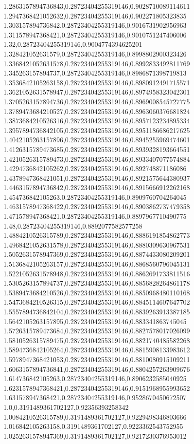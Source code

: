 1.2863157894736843,0.28723404255319146,0.9028710089114611
1.2947368421052632,0.28723404255319146,0.902271805323835
1.303157894736842,0.28723404255319146,0.9016731902956963
1.311578947368421,0.28723404255319146,0.9010751247406006
1.32,0.28723404255319146,0.9004774394625201
1.328421052631579,0.28723404255319146,0.8998802900323426
1.3368421052631578,0.28723404255319146,0.8992833492811769
1.345263157894737,0.28723404255319146,0.8986871398719813
1.3536842105263158,0.28723404255319146,0.8980912491715571
1.3621052631578947,0.28723404255319146,0.8974958323042301
1.3705263157894736,0.28723404255319146,0.8969008545727775
1.3789473684210527,0.28723404255319146,0.8963060376681824
1.3873684210526316,0.28723404255319146,0.8957123234895334
1.3957894736842105,0.28723404255319146,0.8951186686217625
1.4042105263157896,0.28723404255319146,0.8945255969474601
1.4126315789473685,0.28723404255319146,0.8939328193664551
1.4210526315789473,0.28723404255319146,0.8933407077574884
1.4294736842105262,0.28723404255319146,0.892748871186086
1.4378947368421051,0.28723404255319146,0.8921575644380937
1.4463157894736842,0.28723404255319146,0.8915666912262168
1.454736842105263,0.28723404255319146,0.8909760704264045
1.4631578947368422,0.28723404255319146,0.8903862737479358
1.471578947368421,0.28723404255319146,0.8897967710490775
1.48,0.28723404255319146,0.8892077582577258
1.4884210526315789,0.28723404255319146,0.8886191854862773
1.4968421052631578,0.28723404255319146,0.8880309630967531
1.5052631578947369,0.28723404255319146,0.8874433080209201
1.5136842105263157,0.28723404255319146,0.8868560796045131
1.5221052631578948,0.28723404255319146,0.8862691733811516
1.5305263157894737,0.28723404255319146,0.8856828264861178
1.5389473684210526,0.28723404255319146,0.8850968480110168
1.5473684210526315,0.28723404255319146,0.8845114607647702
1.5557894736842104,0.28723404255319146,0.8839263913387185
1.5642105263157895,0.28723404255319146,0.883341863745045
1.5726315789473684,0.28723404255319146,0.8827578017026099
1.5810526315789475,0.28723404255319146,0.8821740485582268
1.5894736842105264,0.28723404255319146,0.8815908133983612
1.5978947368421053,0.28723404255319146,0.8810080915109211
1.6063157894736841,0.28723404255319146,0.8804257263909676
1.614736842105263,0.28723404255319146,0.8906232585040925
1.6231578947368421,0.28723404255319146,0.9151968955993652
1.631578947368421,0.28723404255319146,0.9528670450672507
1.0,0.3191489361702127,0.92356393258342
1.0084210526315789,0.3191489361702127,0.9229498346803666
1.016842105263158,0.3191489361702127,0.9223362543752955
1.0252631578947369,0.3191489361702127,0.9217230376953012
